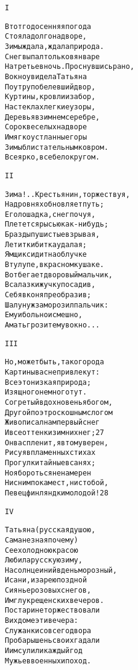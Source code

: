 \begin{minipage}[t]{\dimexpr 0.5\textwidth -\tabcolsep-.5pt}
\begin{alltt}\normalfont\centering
I

В тот год осенняя погода
Стояла долго на дворе,
Зимы ждала, ждала природа.
Снег выпал только в январе
На третье в ночь. Проснувшись рано,
В окно увидела Татьяна
Поутру побелевший двор,
Куртины, кровли и забор,
На стеклах легкие узоры,
Деревья в зимнем серебре,
Сорок веселых на дворе
И мягко устланные горы
Зимы блистательным ковром.
Все ярко, все бело кругом.
\end{alltt}
\end{minipage}

\begin{minipage}[t]{\dimexpr 0.5\textwidth -\tabcolsep-.5pt}
\begin{alltt}\normalfont\centering
II

Зима!.. Крестьянин, торжествуя,
На дровнях обновляет путь;
Его лошадка, снег почуя,
Плетется рысью как-нибудь;
Бразды пушистые взрывая,
Летит кибитка удалая;
Ямщик сидит на облучке
В тулупе, в красном кушаке.
Вот бегает дворовый мальчик,
В салазки жучку посадив,
Себя в коня преобразив;
Шалун уж заморозил пальчик:
Ему и больно и смешно,
А мать грозит ему в окно...
\end{alltt}
\end{minipage}
\clearpage

\begin{minipage}[t]{\dimexpr 0.5\textwidth -\tabcolsep-.5pt}
\begin{alltt}\normalfont\centering
III

Но, может быть, такого рода
Картины вас не привлекут:
Все это низкая природа;
Изящного не много тут.
Согретый вдохновенья богом,
Другой поэт роскошным слогом
Живописал нам первый снег
И все оттенки зимних нег; 27
Он вас пленит, я в том уверен,
Рисуя в пламенных стихах
Прогулки тайные в санях;
Но я бороться не намерен
Ни с ним покамест, ни с тобой,
Певец финляндки молодой! 28
\end{alltt}
\end{minipage}

\begin{minipage}[t]{\dimexpr 0.5\textwidth -\tabcolsep-.5pt}
\begin{alltt}\normalfont\centering
IV

Татьяна (русская душою,
Сама не зная почему)
С ее холодною красою
Любила русскую зиму,
На солнце иний в день морозный,
И сани, и зарею поздной
Сиянье розовых снегов,
И мглу крещенских вечеров.
По старине торжествовали
В их доме эти вечера:
Служанки со всего двора
Про барышень своих гадали
И им сулили каждый год
Мужьев военных и поход.
\end{alltt}
\end{minipage}
\clearpage

